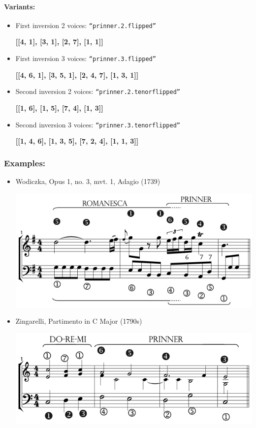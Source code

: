\documentclass[11pt, openany]{article}
\begin{document}
\paragraph{Variants:}
\begin{itemize}
\item First inversion 2 voices: \texttt{“prinner.2.flipped”}
	\begin{center}
	\textbf{[[4, 1], [3, 1], [2, 7], [1, 1]]}
	\end{center}
\item First inversion 3 voices: \texttt{“prinner.3.flipped”}
	\begin{center}
	\textbf{[[4, 6, 1], [3, 5, 1], [2, 4, 7], [1, 3, 1]]}
	\end{center}
\item Second inversion 2 voices: \texttt{“prinner.2.tenorflipped”}
	\begin{center}
	\textbf{[[1, 6], [1, 5], [7, 4], [1, 3]]}
	\end{center}
\item Second inversion 3 voices: \texttt{“prinner.3.tenorflipped”}
	\begin{center}
	\textbf{[[1, 4, 6], [1, 3, 5], [7, 2, 4], [1, 1, 3]]}
	\end{center}
\end{itemize}

\subsubsection{Examples:}
\begin{itemize}
\item Wodiczka, Opus 1, no. 3, mvt. 1, Adagio (1739)
\begin{center}
\includegraphics[scale=0.5]{wodiczka1c.png}
\end{center}
\item Zingarelli, Partimento in C Major (1790s)
\begin{center}
\includegraphics[scale=0.5]{zingarelliparti.png}
\end{center}
\end{itemize}
\end{document}
